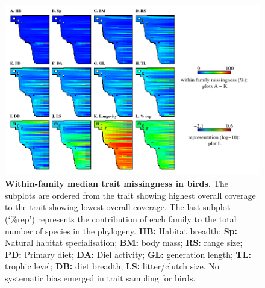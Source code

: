 \clearpage
\begin{figure}[]
\centering
\includegraphics[scale=1.1]{figures/chapter2/NA_phylo_patterns/Birds_coverage}
\caption[Within-family median trait missingness in birds]{\textbf{Within-family median trait missingness in birds.} The subplots are ordered from the trait showing highest overall coverage to the trait showing lowest overall coverage. The last subplot (`\%rep') represents the contribution of each family to the total number of species in the phylogeny. \textbf{HB:} Habitat breadth; \textbf{Sp:} Natural habitat specialisation; \textbf{BM:} body mass; \textbf{RS:} range size; \textbf{PD:} Primary diet; \textbf{DA:} Diel activity; \textbf{GL:} generation length;  \textbf{TL:} trophic level; \textbf{DB:} diet breadth; \textbf{LS:} litter/clutch size. No systematic bias emerged in trait sampling for birds.}
\label{familycov_birds}
\end{figure}

